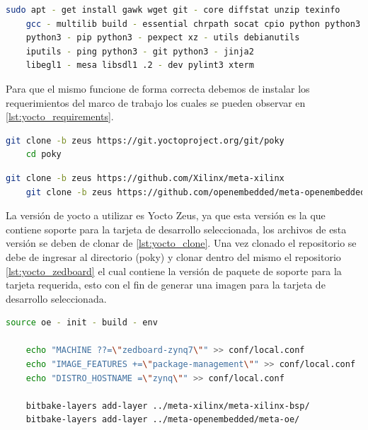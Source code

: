 \begin{lstlisting}[language=bash, caption={Requerimientos Yocto Zeus, Linux}, label=lst:yocto_requirements]
    sudo apt - get install gawk wget git - core diffstat unzip texinfo
    gcc - multilib build - essential chrpath socat cpio python python3
    python3 - pip python3 - pexpect xz - utils debianutils 
    iputils - ping python3 - git python3 - jinja2 
    libegl1 - mesa libsdl1 .2 - dev pylint3 xterm
\end{lstlisting}

Para que el mismo funcione de forma correcta debemos de instalar los requerimientos del marco de trabajo los cuales se pueden observar en \ref{lst:yocto_requirements}.

\begin{lstlisting}[language=bash, caption={Version de Yocto}, label=lst:yocto_clone]
    git clone -b zeus https://git.yoctoproject.org/git/poky
    cd poky
\end{lstlisting}

\begin{lstlisting}[language=bash, caption={BSP para Zedboard}, label=lst:yocto_zedboard]
    git clone -b zeus https://github.com/Xilinx/meta-xilinx
    git clone -b zeus https://github.com/openembedded/meta-openembedded.git
\end{lstlisting}

La versión de yocto a utilizar es Yocto Zeus, ya que esta versión es la que contiene soporte para la tarjeta de desarrollo seleccionada, los archivos de esta versión se deben de clonar de \ref{lst:yocto_clone}. Una vez clonado el repositorio se debe de ingresar al directorio (poky) y clonar dentro del mismo el repositorio \ref{lst:yocto_zedboard} el cual contiene la versión de paquete de soporte para la tarjeta requerida, esto con el fin de generar una imagen para la tarjeta de desarrollo seleccionada.

\begin{lstlisting}[language=bash, caption={Configuraciones adicionales, Yocto}, label=lst:aditional_config]
    source oe - init - build - env
    
    echo "MACHINE ??=\"zedboard-zynq7\"" >> conf/local.conf
    echo "IMAGE_FEATURES +=\"package-management\"" >> conf/local.conf
    echo "DISTRO_HOSTNAME =\"zynq\"" >> conf/local.conf
    
    bitbake-layers add-layer ../meta-xilinx/meta-xilinx-bsp/
    bitbake-layers add-layer ../meta-openembedded/meta-oe/
\end{lstlisting}

